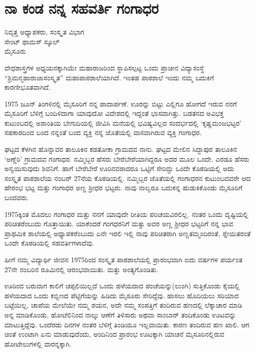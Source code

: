 {\fontsize{14}{16}\selectfont
\chapter{ನಾ ಕಂಡ ನನ್ನ ಸಹವರ್ತಿ ಗಂಗಾಧರ}

\begin{center}

ನಿವೃತ್ತ ಅಧ್ಯಾಪಕರು,  ಸಂಸ್ಕೃತ ವಿಭಾಗ\\
ಸೇಂಟ್ ಥಾಮಸ್ ಸ್ಕೂಲ್\\
ಮೈಸೂರು
\addrule
\end{center}

ವೇಧ\enginline{-}ಶಾಸ್ತ್ರಗಳ ಅಧ್ಯಯನಕ್ಕಾಗಿಯೇ ಮಹಾರಾಜರಿಂದ ಸ್ಥಾಪಿಸಲ್ಪಟ್ಟ ಒಂದು ಪ್ರಾಚೀನ ವಿದ್ಯಾಸಂಸ್ಥೆ   “ಶ್ರಿಮನ್ಮಹಾರಾಜಾಸಂಸ್ಕೃತ” ಮಹಾಪಾಠಶಾಲೆಯಾಗಿದೆ.  ಇಂತಹ ಪಾಠಶಾಲೆ ಇಂದು ನಮ್ಮ ಬದುಕಿಗೆ ಕಾರಣೀಭೂತವಾಗಿದೆ. 
\vskip 3pt

1975 ಜೂನ್ ತಿಂಗಳಿನಲ್ಲಿ ಮೈಸೂರಿಗೆ ನನ್ನ ಪಾದಾರ್ಪಣೆ. ಊರನ್ನು ಬಿಟ್ಟು ಎಲ್ಲಿಗೂ ಹೋಗದೆ ಇರುವ ನನಗೆ ಮೈಸೂರಿಗೆ ಬೆಳಿಗ್ಗೆ ಬಂದಿಳಿದಾಗಾ ಯಾವುದೋ ವಿದೇಶದಲ್ಲಿ ಇದ್ದಂತೆ ಭಾಸವಾಗಿತ್ತು. ಬಡತನದ ಅವಿಭಕ್ತ ಕುಟುಂಬದಲ್ಲಿ  ಅಶಾಂತಿಯ ಬೇಗುದಿಯಲ್ಲಿ ಜೀವಿಸಿ ಮನೆಯಲ್ಲಿ ಭವಿಷ್ಯವಿಲ್ಲದ ಸಂದರ್ಭದಲ್ಲಿ ‘ಕೃಷ್ಣಮಂಜಭಟ್ಟರ’ ಸಹಕಾರದಿಂದ ಬಂದ ನನ್ನಂತೆ  ಬಂದ ವ್ಯಕ್ತಿ ನನ್ನ ಜೊತೆಯಲ್ಲಿ ವಾಸವಾಗಿರುವ ವ್ಯಕ್ತಿ ಗಂಗಾಧರ.
\vskip 3pt

ಘಟ್ಟದ ಕೆಳಗಿನ ಹೊನ್ನಾವರ ತಾಲೂಕಿನ ಕಡತೋಕಾ ಗ್ರಾಮದವ ನಾನು. ಘಟ್ಟದ ಮೇಲಿನ ಸಿದ್ದಾಪುರ ತಾಲೂಕಿನ ‘ಅಣ್ಣೆರಿ’ ಗ್ರಾಮದವ ಗಂಗಾಧರ. ನಮ್ಮಿಬ್ಬರ ಹೆಸರು ಬೇರೆ\enginline{-}ಬೇರೆಯಾಗಿದ್ದರೂ ಅದರ ಮೂಲ ಒಂದೇ. ಎರಡೂ ಹೆಸರು   ಅನ್ವಯಿಸುವುದು ಶಿವನಿಗೆ. ಹಾಗೆ ಬೇರೆ\enginline{-}ಬೇರೆ  ಊರಿನವರಾದರೂ ಒಟ್ಟಿಗೆ ಸೇರಿದ್ದು ಒಂದೇ ಕೊಠಡಿ\-ಯಲ್ಲಿ ಅದು ಸಂಸ್ಕೃತ ಪಾಠಶಾಲೆಯ  ನಂಬರ್ 27ನೆಯ ಕೊಠಡಿಯಲ್ಲಿ. ನಮ್ಮಿಬ್ಬರ ಜೊತೆಯಲ್ಲಿ ಗಂಗಾಧರನ ಕುಟುಂಬದವರೇ ಆದ ಹೇರಂಭ ಭಟ್ಟ ಮತ್ತು ಗಂಗಾಧರ ಅಣ್ಣ ಶ್ರೀಧರ ಭಟ್ಟರು. ನಾವು ನಾಲ್ವರೂ ಬದುಕನ್ನ ಹುಡುಕಿಕೊಂಡು ಮೈಸೂರಿಗೆ ಬಂದವರು. 

1975ಕ್ಕಿಂತ  ಮೊದಲು ಗಂಗಾಧರ ಮತ್ತು ನನಗೆ ಯಾವುದೇ ರೀತಿಯ ಪರಿಚಯ\-ವಿರಲಿಲ್ಲ. ನಂತರ ಒಂದು ದೃಷ್ಟಿಯಲ್ಲಿ ಪರಿಚಿತರೆಂಬುದು ಗೊತ್ತಾಯಿತು. ಯಾಕೆಂದರೆ  ಗಂಗಧರನಿಗೆ ಮತ್ತು ಅವರ ಅಣ್ಣ ಶ್ರೀಧರ ಭಟ್ಟರಿಗೆ  ನನ್ನ ಭಾವ ಪ್ರಾಥಮಿಕ ಶಾಲೆಯಲ್ಲಿ ಅಧ್ಯಾಪಕರೆಂಬುದು  ಏನೇ ಇರಲಿ ಇಲ್ಲಿ ನಾವು ಪರಿಚಿತರಾಗಿ ಅಣ್ಣತಮ್ಮಂದಿರಂತೆ,  ಸ್ನೇಯಿತರಂತೆ ಒಂದೇ ಕೊಠಡಿಯಲ್ಲಿ ಸಹವರ್ತಿಗಳಾದೆವು. 

ಹೀಗೆ ನಮ್ಮ ವಿದ್ಯಾರ್ಥಿ ಜೀವನ 1975ರಿಂದ ಸಂಸ್ಕೃತ ಪಾಠಶಾಲೆಯಲ್ಲಿ ಪ್ರಾರಂಭವಾಗಿ ಐದು ವರ್ಷಗಳ ಪರ್ಯಂತ 27ನೇ ನಂಬರಿನ ರೂಮಿನಲ್ಲಿ ಆರಂಭವಾಯಿತು. ಮತ್ತು ಅಂತ್ಯಗೊಂಡಿತು. 

ಊರಿಂದ ಬರುವಾಗ ಕಾಲಿಗೆ ಚಪ್ಪಲಿಯಿಲ್ಲದೆ ಒಂದು ಹಳೆಯದಾದ ಪಂಚೆ\-ಯನ್ನು(ಲುಂಗಿ) ಸುತ್ತಿಕೊಂಡು ಕೈಯಲ್ಲಿ ಹಳೆಯದಾದ ಒಂದು ಕಬ್ಬಿಣದ ಪೆಟ್ಟಿಗೆಯನ್ನು ಹಿಡಿದು ಮೈಸೂರು ಸೇರಿದ್ದೆವು. ಹಾಸಲು  \enginline{-}   ಹೊದಿಯಲು ಸರಿಯಾದ ಬಟ್ಟೆ\-ಯಿಲ್ಲ, ಚಾಪೆಯ ಮೇಲೆಯೇ ನಮ್ಮ ಶಯನ,  ಅದೇ ನಮ್ಮ ಸಂಪತ್ತಿಗೆ ತಂದಿರುವ ಹಣದಲ್ಲಿ ಲೆಕ್ಕಾಚಾರ ಮಾಡಿ ಅನ್ನ ಮಾಡಿಕೊಂಡು, ಹೋಟೆಲಿನಿಂದ ನಾಲ್ಕು ಆಣೆಗೆ ತಿಳಿಸಾರು  ಅಥವಾ ಸಾಂಬಾರ್ ತಂದಿಕೊಂಡು ಊಟವನ್ನು ಮಾಟುತ್ತಿದ್ದೆವು. ಒಂದೆರಡು ದಿನಗಳ ನಂತರ ಬೆಳಿಗ್ಗೆ ತಿಂಡಿಯೂ ಇಲ್ಲವಾಯಿತು. ಕಾರಣ ತಂದಿರುವ ಹಣ ಖಾಲಿ. ಆಗ ಚಿಂತೆ ಉಂಟಾಗಿ ಏನು ಮಾಡುವುದೆಂದು,  ಅಂದಿನಿಂದ ಪ್ರಾರಂಭ ಊಟಕ್ಕಾಗಿ ಯಾಚನೆ  \enginline{-}   ಮೈಸೂರಿನಲ್ಲಿರುವ ಹೋಟೇಲುಗಳಲ್ಲಿ ವಾರನ್ನಕ್ಕಾಗಿ.

}
